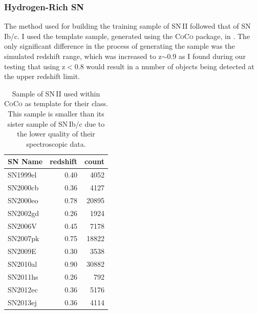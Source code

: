 \subsubsection{Hydrogen-Rich SN}
The method used for building the training sample of SN\,II followed that of SN\,Ib/c. I used the template sample, generated using the \textsc{CoCo} package, in . The only significant difference in the process of generating the sample was the simulated redshift range, which was increased to z$\sim$0.9 as I found during our testing that using z$<$0.8 would result in a number of objects being detected at the upper redshift limit.

\begin{table}
  \caption{Sample of SN\,II used within \textsc{CoCo} as template for their class. This sample is smaller than its sister sample of SN\,Ib/c due to the lower quality of their spectroscopic data.}
  \label{tab:SNIITemplates}
  \centering
  \begin{tabular}{|l|r|r|}
    \hline
    SN Name  & redshift & count \\
    \hline
    SN1999el & 0.40 &  4052 \\
    SN2000cb & 0.36 &  4127 \\
    SN2000eo & 0.78 & 20895 \\
    SN2002gd & 0.26 &  1924 \\
    SN2006V  & 0.45 &  7178 \\
    SN2007pk & 0.75 & 18822 \\
    SN2009E  & 0.30 &  3538 \\
    SN2010al & 0.90 & 30882 \\
    SN2011hs & 0.26 &   792 \\
    SN2012ec & 0.36 &  5176 \\
    SN2013ej & 0.36 &  4114 \\
    \hline
  \end{tabular}
\end{table}

